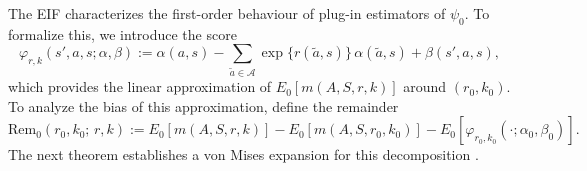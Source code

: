 \documentclass[12pt]{article}
\theoremstyle{plain}
\begin{document}



 
  

 
The EIF characterizes the first-order behaviour of plug-in estimators of $\psi_0$.
To formalize this, we introduce the score
\[
\varphi_{r,k}(s',a,s;\alpha,\beta)
:= \alpha(a,s)
   - \sum_{\tilde a\in\mathcal{A}} \exp\{r(\tilde a,s)\}\,\alpha(\tilde a,s)
   + \beta(s',a,s),
\]
which provides the linear approximation of $E_0[m(A,S,r,k)]$ around $(r_0,k_0)$.
To analyze the bias of this approximation, define the remainder
\[
\mathrm{Rem}_0(r_0,k_0;\, r,k)
:= E_0[m(A,S,r,k)] - E_0[m(A,S,r_0,k_0)]
   - E_0[\varphi_{r_0,k_0}(\cdot;\alpha_0,\beta_0)].
\]
The next theorem establishes a von Mises expansion for this decomposition \citep{mises1947asymptotic}.
\end{document}
